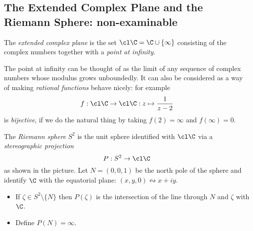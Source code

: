 \setcounter{section}{3}

\graphicspath{{lectures/3Analytic/asy/}}

\setcounter{subsection}{3}
\subsection*{The Extended Complex Plane and the Riemann Sphere: non-examinable}

\begin{defn}
The \emph{extended complex plane} is the set $\cl\C=\C\cup\{\infty\}$ consisting of the complex numbers together with a \emph{point at infinity.}
\end{defn}

The point at infinity can be thought of as the limit of any sequence of complex numbers whose modulus grows unboundedly. It can also be considered as a way of making \emph{rational functions} behave nicely: for example
\[f:\cl\C\to\cl\C:z\mapsto \frac 1{z-2}\]
is \emph{bijective}, if we do the natural thing by taking $f(2)=\infty$ and $f(\infty)=0$. 

\begin{defn}
The \emph{Riemann sphere} $S^2$ is the unit sphere identified with $\cl\C$ via a \emph{stereographic projection}
\[P:S^2\to\cl\C\]
as shown in the picture. Let $N=(0,0,1)$ be the north pole of the sphere and identify $\C$ with the equatorial plane: $(x,y,0)\leftrightsquigarrow x+iy$. 
\begin{itemize}
  \item If $\zeta\in S^2\setminus\{N\}$ then $P(\zeta)$ is the intersection of the line through $N$ and $\zeta$ with $\C$.
  \item Define $P(N)=\infty$.
\end{itemize}
\end{defn}

\begin{center}
\end{center}


